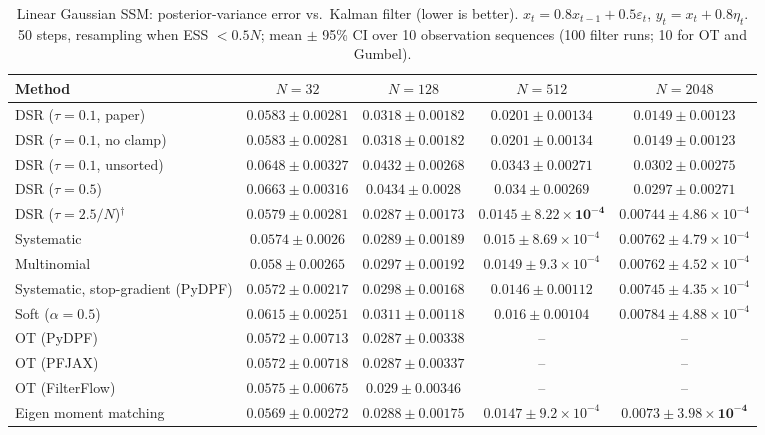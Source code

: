 \begin{table}[H]
\centering
\small
\caption{Linear Gaussian SSM: posterior-variance error vs.\ Kalman filter (lower is better). $x_t=0.8x_{t-1}+0.5\varepsilon_t$, $y_t=x_t+0.8\eta_t$. 50 steps, resampling when ESS $<0.5N$; mean $\pm$ 95\% CI over 10 observation sequences (100 filter runs; 10 for OT and Gumbel).}
\label{tab:linear-posterior_covariance_error}
\begin{adjustbox}{max width=\linewidth}
\begin{tabular}{lcccc}
\toprule
Method & $N{=}32$ & $N{=}128$ & $N{=}512$ & $N{=}2048$ \\
\midrule
DSR ($\tau{=}0.1$, paper) & $0.0583\pm0.00281$ & $0.0318\pm0.00182$ & $0.0201\pm0.00134$ & $0.0149\pm0.00123$ \\
DSR ($\tau{=}0.1$, no clamp) & $0.0583\pm0.00281$ & $0.0318\pm0.00182$ & $0.0201\pm0.00134$ & $0.0149\pm0.00123$ \\
DSR ($\tau{=}0.1$, unsorted) & $0.0648\pm0.00327$ & $0.0432\pm0.00268$ & $0.0343\pm0.00271$ & $0.0302\pm0.00275$ \\
DSR ($\tau{=}0.5$) & $0.0663\pm0.00316$ & $0.0434\pm0.0028$ & $0.034\pm0.00269$ & $0.0297\pm0.00271$ \\
DSR ($\tau{=}2.5/N$)$^\dagger$ & $0.0579\pm0.00281$ & $\mathbf{0.0287\pm0.00173}$ & $\mathbf{0.0145\pm8.22\times10^{-4}}$ & $0.00744\pm4.86\times10^{-4}$ \\
\midrule
Systematic & $0.0574\pm0.0026$ & $0.0289\pm0.00189$ & $0.015\pm8.69\times10^{-4}$ & $0.00762\pm4.79\times10^{-4}$ \\
Multinomial & $0.058\pm0.00265$ & $0.0297\pm0.00192$ & $0.0149\pm9.3\times10^{-4}$ & $0.00762\pm4.52\times10^{-4}$ \\
Systematic, stop-gradient (PyDPF) & $0.0572\pm0.00217$ & $0.0298\pm0.00168$ & $0.0146\pm0.00112$ & $0.00745\pm4.35\times10^{-4}$ \\
Soft ($\alpha{=}0.5$) & $0.0615\pm0.00251$ & $0.0311\pm0.00118$ & $0.016\pm0.00104$ & $0.00784\pm4.88\times10^{-4}$ \\
OT (PyDPF) & $0.0572\pm0.00713$ & $0.0287\pm0.00338$ & -- & -- \\
OT (PFJAX) & $0.0572\pm0.00718$ & $0.0287\pm0.00337$ & -- & -- \\
OT (FilterFlow) & $0.0575\pm0.00675$ & $0.029\pm0.00346$ & -- & -- \\
Eigen moment matching & $0.0569\pm0.00272$ & $0.0288\pm0.00175$ & $0.0147\pm9.2\times10^{-4}$ & $\mathbf{0.0073\pm3.98\times10^{-4}}$ \\

\end{tabular}
\end{adjustbox}
\end{table}

